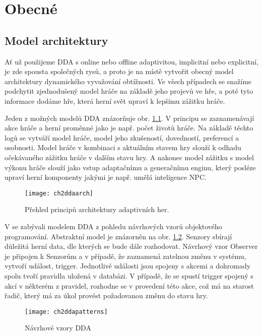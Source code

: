 \chapter{Obecné}


\section{Model architektury}

Ať už použijeme DDA s online nebo offline adaptivitou, implicitní nebo explicitní, je zde spousta společných rysů, a proto je na místě vytvořit obecný model architektury dynamického vyvažování obtížnosti. Ve všech případech se snažíme podchytit zjednodušený model hráče na základě jeho projevů ve hře, a poté tyto informace dodáme hře, která herní svět upraví k lepšímu zážitku hráče.

Jeden z možných modelů DDA znázorňuje obr. \ref{fig:ch2ddaarch}. V principu se zaznamenávají akce hráče a herní proměnné jako je např. počet životů hráče. Na základě těchto logů se vytváří model hráče, model jeho zkušeností, dovedností, preferencí a osobnosti. Model hráče v kombinaci s aktuálním stavem hry slouží k odhadu očekávaného zážitku hráče v dalším stavu hry. A nakonec model zážitku s model výkonu hráče slouží jako vstup adaptačnímu a generačnímu enginu, který posléze upraví herní komponenty jakými je např. umělá inteligence NPC.

\begin{figure}
  \centering
  \texttt{[image: ch2ddaarch]}
	\caption{Přehled principů architektury adaptivních her. \cite{16Survey} }
	\label{fig:ch2ddaarch}
\end{figure}

V \cite{SwPatterns} se zabývali modelem DDA z pohledu návrhových vzorů objektového programování. Abstraktní model je znázorněn na obr. \ref{fig:ch2ddapatterns}. Senzory sbírají důležitá herní data, dle kterých se bude dále rozhodovat. Návrhový vzor Observer je připojen k Senzorům a v případě, že zaznamená zatelnou změnu v systému, vytvoří událost, trigger. Jednotlivé události jsou spojeny s akcemi a dohromady spolu tvoří pravidla uložená v databázi. V případě, že se spustí trigger spojený s akcí v některém z pravidel, rozhodne se v provedení této akce, což má na starost řadič, který má za úkol provést požadovanou změnu do stavu hry.

\begin{figure}
  \centering
  \texttt{[image: ch2ddapatterns]}
	\caption{Návrhové vzory DDA \cite{SwPatterns} }
	\label{fig:ch2ddapatterns}
\end{figure}

